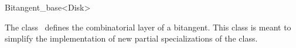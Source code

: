 
\ccRefPageBegin


\begin{ccRefClass}{Bitangent_base<Disk>}
\label{pageBitangentBaseRef}

\ccDefinition

The class \ccRefName\ defines the combinatorial layer of a bitangent. This class
is meant to simplify the implementation of new partial specializations of the
 class.


\ccIsModel
{}

\ccSeeAlso
{}

\end{ccRefClass}

\ccRefPageEnd

